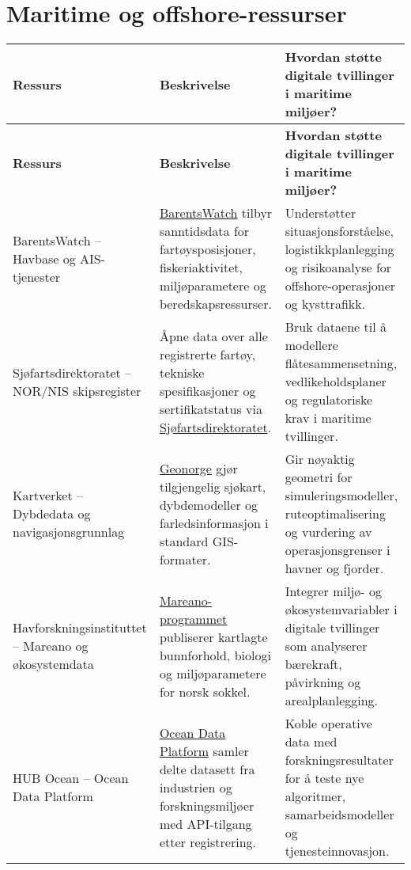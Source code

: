 \section{Maritime og offshore-ressurser}
\label{sec:maritimressurser}
\begin{longtable}{p{}p{}p{}}
\toprule
\textbf{Ressurs} & \textbf{Beskrivelse} & \textbf{Hvordan støtte digitale tvillinger i maritime miljøer?} \\
\midrule
\endfirsthead
\toprule
\textbf{Ressurs} & \textbf{Beskrivelse} & \textbf{Hvordan støtte digitale tvillinger i maritime miljøer?} \\
\midrule
\endhead
BarentsWatch – Havbase og AIS-tjenester & \href{https://www.barentswatch.no/}{BarentsWatch} tilbyr sanntidsdata for fartøysposisjoner, fiskeriaktivitet, miljøparametere og beredskapsressurser. & Understøtter situasjonsforståelse, logistikkplanlegging og risikoanalyse for offshore-operasjoner og kysttrafikk. \\
\addlinespace
Sjøfartsdirektoratet – NOR/NIS skipsregister & Åpne data over alle registrerte fartøy, tekniske spesifikasjoner og sertifikatstatus via \href{https://www.sdir.no/digitalt/apne-data/}{Sjøfartsdirektoratet}. & Bruk dataene til å modellere flåtesammensetning, vedlikeholdsplaner og regulatoriske krav i maritime tvillinger. \\
\addlinespace
Kartverket – Dybdedata og navigasjonsgrunnlag & \href{https://www.geonorge.no/}{Geonorge} gjør tilgjengelig sjøkart, dybdemodeller og farledsinformasjon i standard GIS-formater. & Gir nøyaktig geometri for simuleringsmodeller, ruteoptimalisering og vurdering av operasjonsgrenser i havner og fjorder. \\
\addlinespace
Havforskningsinstituttet – Mareano og økosystemdata & \href{https://www.hi.no/hi/forskning/mareano}{Mareano-programmet} publiserer kartlagte bunnforhold, biologi og miljøparametere for norsk sokkel. & Integrer miljø- og økosystemvariabler i digitale tvillinger som analyserer bærekraft, påvirkning og arealplanlegging. \\
\addlinespace
HUB Ocean – Ocean Data Platform & \href{https://portal.hubocean.no/}{Ocean Data Platform} samler delte datasett fra industrien og forskningsmiljøer med API-tilgang etter registrering. & Koble operative data med forskningsresultater for å teste nye algoritmer, samarbeidsmodeller og tjenesteinnovasjon. \\
\bottomrule
\end{longtable}

